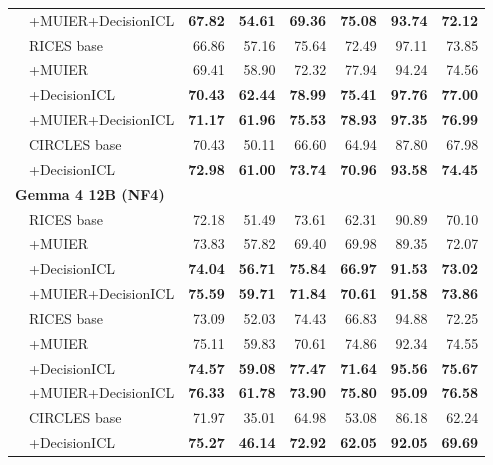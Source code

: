 \documentclass[10pt,twocolumn,letterpaper]{article}
\begin{document}
\begin{table}[t]
\begin{tabular}{llrrrrrr}
 & +MUIER+DecisionICL & \textbf{67.82} & \textbf{54.61} & \textbf{69.36} & \textbf{75.08} & \textbf{93.74} & \textbf{72.12} \\
\addlinespace[3pt]
2 & RICES base & 66.86 & 57.16 & 75.64 & 72.49 & 97.11 & 73.85 \\
 & +MUIER & 69.41 & 58.90 & 72.32 & 77.94 & 94.24 & 74.56 \\
 & +DecisionICL & \textbf{70.43} & \textbf{62.44} & \textbf{78.99} & \textbf{75.41} & \textbf{97.76} & \textbf{77.00} \\
 & +MUIER+DecisionICL & \textbf{71.17} & \textbf{61.96} & \textbf{75.53} & \textbf{78.93} & \textbf{97.35} & \textbf{76.99} \\
\addlinespace[3pt]
2 & CIRCLES base & 70.43 & 50.11 & 66.60 & 64.94 & 87.80 & 67.98 \\
 & +DecisionICL & \textbf{72.98} & \textbf{61.00} & \textbf{73.74} & \textbf{70.96} & \textbf{93.58} & \textbf{74.45} \\
\midrule
\multicolumn{8}{l}{\textbf{Gemma 4 12B (NF4)}} \\
\addlinespace[2pt]
1 & RICES base & 72.18 & 51.49 & 73.61 & 62.31 & 90.89 & 70.10 \\
 & +MUIER & 73.83 & 57.82 & 69.40 & 69.98 & 89.35 & 72.07 \\
 & +DecisionICL & \textbf{74.04} & \textbf{56.71} & \textbf{75.84} & \textbf{66.97} & \textbf{91.53} & \textbf{73.02} \\
 & +MUIER+DecisionICL & \textbf{75.59} & \textbf{59.71} & \textbf{71.84} & \textbf{70.61} & \textbf{91.58} & \textbf{73.86} \\
\addlinespace[3pt]
2 & RICES base & 73.09 & 52.03 & 74.43 & 66.83 & 94.88 & 72.25 \\
 & +MUIER & 75.11 & 59.83 & 70.61 & 74.86 & 92.34 & 74.55 \\
 & +DecisionICL & \textbf{74.57} & \textbf{59.08} & \textbf{77.47} & \textbf{71.64} & \textbf{95.56} & \textbf{75.67} \\
 & +MUIER+DecisionICL & \textbf{76.33} & \textbf{61.78} & \textbf{73.90} & \textbf{75.80} & \textbf{95.09} & \textbf{76.58} \\
\addlinespace[3pt]
2 & CIRCLES base & 71.97 & 35.01 & 64.98 & 53.08 & 86.18 & 62.24 \\
 & +DecisionICL & \textbf{75.27} & \textbf{46.14} & \textbf{72.92} & \textbf{62.05} & \textbf{92.05} & \textbf{69.69} \\
\bottomrule
\end{tabular}
\end{table}
\end{document}
